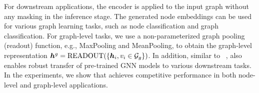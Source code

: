 For downstream applications, the encoder is applied to the input graph without any masking in the inference stage. 
The generated node embeddings can be used for various graph learning tasks, such as node classification and graph classification. 
For graph-level tasks, we use a non-parameterized graph pooling (readout) function, e.g., MaxPooling and  MeanPooling, to obtain the graph-level representation 
$ {\bm{h}}^g = \mathrm{READOUT}(\{{\bm{h}}_i, v_i \in \mathcal{G}_g \}) $.
In addition, similar to ~\cite{hu2020strategies}, \model also enables robust transfer of pre-trained GNN models to various downstream tasks.
In the experiments, we show that \model achieves competitive performance in both node-level and graph-level applications. 

 

































